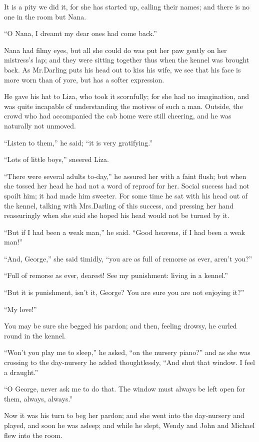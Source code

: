 It is a pity we did it, for she has started up, calling their names;
and there is no one in the room but Nana.

“O Nana, I dreamt my dear ones had come back.”

Nana had filmy eyes, but all she could do was put her paw gently on her mistress’s lap;
and they were sitting together thus when the kennel was brought back.
As Mr.\@ Darling puts his head out to kiss his wife,
we see that his face is more worn than of yore, but has a softer expression.

He gave his hat to Liza, who took it scornfully;
for she had no imagination, and was quite incapable of understanding the motives of such a man.
Outside, the crowd who had accompanied the cab home were still cheering,
and he was naturally not unmoved.

“Listen to them,” he said;
“it is very gratifying.”

“Lots of little boys,” sneered Liza.

“There were several adults to‐day,” he assured her with a faint flush;
but when she tossed her head he had not a word of reproof for her.
Social success had not spoilt him;
it had made him sweeter.
For some time he sat with his head out of the kennel,
talking with Mrs.\@ Darling of this success,
and pressing her hand reassuringly when she said she hoped his head would not be turned by it.

“But if I had been a weak man,” he said.
“Good heavens, if I had been a weak man!”

“And, George,” she said timidly,
“you are as full of remorse as ever, aren’t you?”

“Full of remorse as ever, dearest!
See my punishment:
living in a kennel.”

“But it is punishment, isn’t it, George?
You are sure you are not enjoying it?”

“My love!”

You may be sure she begged his pardon;
and then, feeling drowsy, he curled round in the kennel.

“Won’t you play me to sleep,” he asked, “on the nursery piano?\@”
and as she was crossing to the day‐nursery he added thoughtlessly,
“And shut that window.
I feel a draught.”

“O George, never ask me to do that.
The window must always be left open for them, always, always.”

Now it was his turn to beg her pardon;
and she went into the day‐nursery and played, and soon he was asleep;
and while he slept, Wendy and John and Michael flew into the room.

